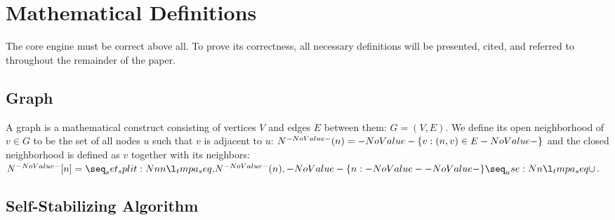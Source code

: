 \section{Mathematical Definitions}
\label{sec:math-defin}

The core engine must be correct above all.
To prove its correctness, all necessary definitions will be
  presented, cited, and referred to throughout the remainder of the paper.

\subsection{Graph}
\label{sec:math-defin:graphs}

A graph is a mathematical construct
  consisting of vertices $V$ and edges $E$ between them: $G = (V, E)$.
We define its open neighborhood of $v \in G$ to be
  the set of all nodes $u$ such that $v$ is adjacent to $u$:
  $\OpenNeighborhood{n} = \Set{v}[(n, v) \in E]$
  and the closed neighborhood is defined as $v$ together with its neighbors:
  $\ClosedNeighborhood{n} = \Union{\OpenNeighborhood{n}, \Set{n}}$.

\begin{comment}
\subsection{Finite State Machine}
\label{sec:math-define:fsm}

A finite state machine (\textsc{fsm})
  \todo{use acro package}
  \todo{may not even \emph{need} this section}
  is a mathematical model of computation
  described by an alphabet $\Sigma$,
  a finite number of states $Q$,
  an initial state $q_0 \in Q$,
  a set of accept states $F \subseteq Q$,
  and a transition function $\Function[\delta]{Q \cross \Sigma}{Q}$ between those states.
Thus, a fsm is defined by the five-tuple %
  \[ M = (\Sigma, Q, q_0, F, \delta). \]
These can be represented as graphs where nodes are states in $Q$ and
  transitions are directed edges between them.
\todo[cite]{finite state machine}
\end{comment}

\subsection{Self-Stabilizing Algorithm}
\label{sec:math-define:self-stab-algor}

